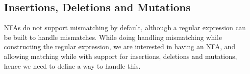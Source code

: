 




\newpage

\subsection{Insertions, Deletions and Mutations}
NFAs do not support mismatching by default, although a regular expression can be built to handle mismatches. While doing handling mismatching while constructing the regular expression, we are interested in having an NFA, and allowing matching while with support for insertions, deletions and mutations, hence we need to define a way to handle this.

